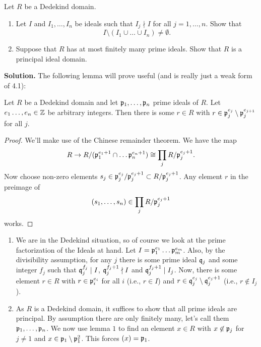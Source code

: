 \documentclass[a4paper,11pt]{article}
\begin{document}
Let $R$ be a Dedekind domain.
\begin{enumerate}
    \item Let $I$ and $I_1, \dots, I_n$ be ideals such that 
        $I_j \nmid I$ for all $j = 1, \dots, n$. Show that 
        \begin{equation*}
            I\setminus(I_1 \cup \dots \cup I_n) \neq \emptyset.
        \end{equation*}
    \item Suppose that $R$ has at most finitely many prime ideals. 
        Show that $R$ is a principal ideal domain.
\end{enumerate}
\textbf{Solution.}
The following lemma will prove useful (and is really just a weak form of 
4.1):
\begin{lem}\label{lem:1}
    Let $R$ be a Dedekind domain and let $\mathfrak{p}_1, \dots, \mathfrak{p}_n$ prime ideals of $R$.
    Let $e_1 \dots, e_n \in \mathbb{Z}$ be arbitrary integers. Then there is some 
    $r \in R$ with $r \in \mathfrak{p}_j^{e_j}\setminus \mathfrak{p}_j^{e_{j+1}}$ for all $j$. 
\begin{proof}
    We'll make use of the Chinese remainder theorem. We have the map
    \begin{equation*}
        R \to R/(\mathfrak{p}_1^{e_1+1} \cap \dots \mathfrak{p}_n^{e_n+1}) \cong
        \prod_j R/\mathfrak{p}_j^{e_j+1}.
    \end{equation*}
    Now choose non-zero elements $s_j \in \mathfrak{p}_j^{e_j}/\mathfrak{p}_j^{e_j+1} \subset
    R/\mathfrak{p}_j^{e_j+1}$. Any element $r$ in the preimage of 
    \begin{equation*}
        (s_1, \dots, s_n) \in \prod_j R/\mathfrak{p}_j^{e_j+1}
    \end{equation*}
    works.
\end{proof}
\end{lem}
\begin{enumerate}
    \item We are in the Dedekind situation, so of course we look at the prime
        factorization of the Ideals at hand. Let 
        $I = \mathfrak{p}_1^{e_1} \dots \mathfrak{p}_m^{e_m}$. Also, by the divisibility
        assumption, for any $j$ there is some prime ideal $\mathfrak{q}_j$ and some integer $f_j$ 
        such that $\mathfrak{q}_j^{f_j} \mid I$, $\mathfrak{q}_j^{f_j+1} \nmid I$ and 
        $\mathfrak{q}_j^{f_j+1} \mid I_j$. Now, there is some element 
        $r \in R$ with $r \in \mathfrak{p}_i^{e_i}$ for all $i$ (i.e., $r \in I$) and 
        $r \in \mathfrak{q}_j^{e_j}\setminus\mathfrak{q}_j^{e_j+1}$
        (i.e., $r \not \in I_j$).

    \item As $R$ is a Dedekind domain, it suffices to show that all
        prime ideals are principal. By assumption there are only finitely many,
        let's call them $\mathfrak{p}_1, \dots, \mathfrak{p}_n$. We now use lemma $1$ to find an
        element $x \in R$ with $x \not \in \mathfrak{p}_j$ for $j \neq 1$ and 
        $x \in \mathfrak{p}_1 \setminus\mathfrak{p}_1^2$. This forces $(x) = \mathfrak{p}_1$. 
\end{enumerate}
\end{document}
